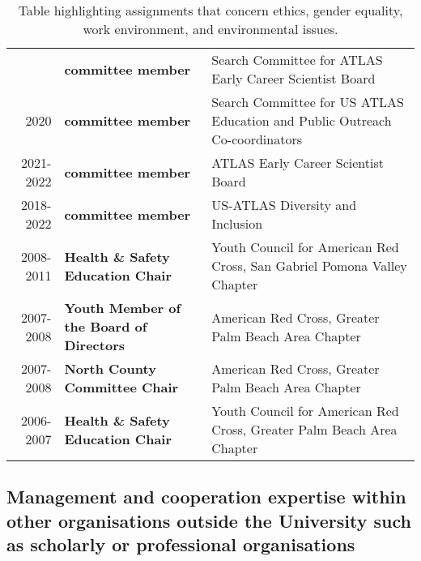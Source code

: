 \begin{table}[h!]
	\centering
	\footnotesize
	\caption{Table highlighting assignments that concern ethics, gender equality, work environment, and environmental issues.}
	\begin{tabular}{r|>{\bfseries}lp{20em}}
		\centering
		2022      & committee member                       & Search Committee for ATLAS Early Career Scientist Board                     \\
		2020      & committee member                       & Search Committee for US ATLAS Education and Public Outreach Co-coordinators \\
		2021-2022 & committee member                       & ATLAS Early Career Scientist Board                                          \\
		2018-2022 & committee member                       & US-ATLAS Diversity and Inclusion                                            \\
		2008-2011 & Health \& Safety Education Chair       & Youth Council for American Red Cross, San Gabriel Pomona Valley Chapter     \\
		2007-2008 & Youth Member of the Board of Directors & American Red Cross, Greater Palm Beach Area Chapter                         \\
		2007-2008 & North County Committee Chair           & American Red Cross, Greater Palm Beach Area Chapter                         \\
		2006-2007 & Health \& Safety Education Chair       & Youth Council for American Red Cross, Greater Palm Beach Area Chapter       \\
	\end{tabular}
\end{table}

\subsection{Management and cooperation expertise within other organisations outside the University such as scholarly or professional organisations \noneyet} \label{ssec:management-and-cooperation-expertise-within-other-organisations-outside-the-university-such-as-scholarly-or-professional-organisations-noneyet}
